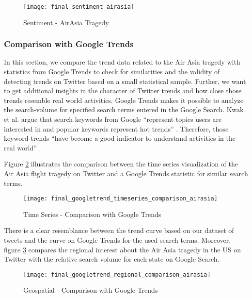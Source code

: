 \begin{figure}[H]
  \centering
        \texttt{[image: final\_sentiment\_airasia]}
  \caption[Sentiment - AirAsia Tragedy]{Sentiment - AirAsia Tragedy}
  \label{fig:air-asia-sentiment}
  \vspace{-1.3em}
\end{figure}

\subsubsection{Comparison with Google Trends}
In this section, we compare the trend data related to the Air Asia tragedy with statistics from Google Trends to check for similarities and the validity of detecting trends on Twitter based on a small statistical sample. Further, we want to get additional insights in the character of Twitter trends and how close those trends resemble real world activities. Google Trends makes it possible to analyze the search-volume for specified search terms entered in the Google Search. Kwak et al. argue that search keywords from Google \enquote{represent topics users are interested in and popular keywords represent hot trends} \cite[6]{kwak2010what}. Therefore, those keyword trends \enquote{have become a good indicator to understand activities in the real world} \cite[6]{kwak2010what}.

Figure \ref{fig:google-trends-comparison-timeseries} illustrates the comparison between the time series visualization of the Air Asia flight tragedy on Twitter and a Google Trends statistic for similar search terms. 

\begin{figure}[H]
  \centering
        \texttt{[image: final\_googletrend\_timeseries\_comparison\_airasia]}
  \caption[Time Series - Comparison with Google Trends]{Time Series - Comparison with Google Trends}
  \label{fig:google-trends-comparison-timeseries}
  \vspace{-1.3em}
\end{figure}

There is a clear resemblance between the trend curve based on our dataset of tweets and the curve on Google Trends for the used search terms. Moreover, figure \ref{fig:google-trends-comparison-geospatial} compares the regional interest about the Air Asia tragedy in the US on Twitter with the relative search volume for each state on Google Search. 

\begin{figure}[H]
  \centering
        \texttt{[image: final\_googletrend\_regional\_comparison\_airasia]}
  \caption[Geospatial - Comparison with Google Trends]{Geospatial - Comparison with Google Trends}
  \label{fig:google-trends-comparison-geospatial}
  \vspace{-1.3em}
\end{figure}

